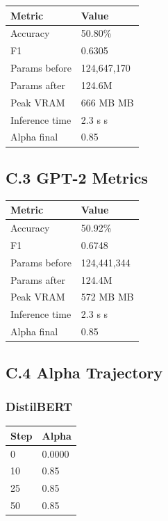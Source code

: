 \begin{table}[H]
\centering
\small
\begin{tabular}{ll}
\toprule
\textbf{Metric} & \textbf{Value} \\
\midrule
Accuracy & 50.80\% \\
F1 & 0.6305 \\
Params before & 124,647,170 \\
Params after & 124.6M \\
Peak VRAM & 666 MB MB \\
Inference time & 2.3 s s \\
Alpha final & 0.85 \\
\bottomrule
\end{tabular}
\end{table}

\subsection{C.3 GPT-2 Metrics}

\begin{table}[H]
\centering
\small
\begin{tabular}{ll}
\toprule
\textbf{Metric} & \textbf{Value} \\
\midrule
Accuracy & 50.92\% \\
F1 & 0.6748 \\
Params before & 124,441,344 \\
Params after & 124.4M \\
Peak VRAM & 572 MB MB \\
Inference time & 2.3 s s \\
Alpha final & 0.85 \\
\bottomrule
\end{tabular}
\end{table}

\subsection{C.4 Alpha Trajectory}

\subsubsection{DistilBERT}

\begin{table}[H]
\centering
\small
\begin{tabular}{ll}
\toprule
\textbf{Step} & \textbf{Alpha} \\
\midrule
0 & 0.0000 \\
10 & 0.85 \\
25 & 0.85 \\
50 & 0.85 \\
\bottomrule
\end{tabular}
\end{table}

